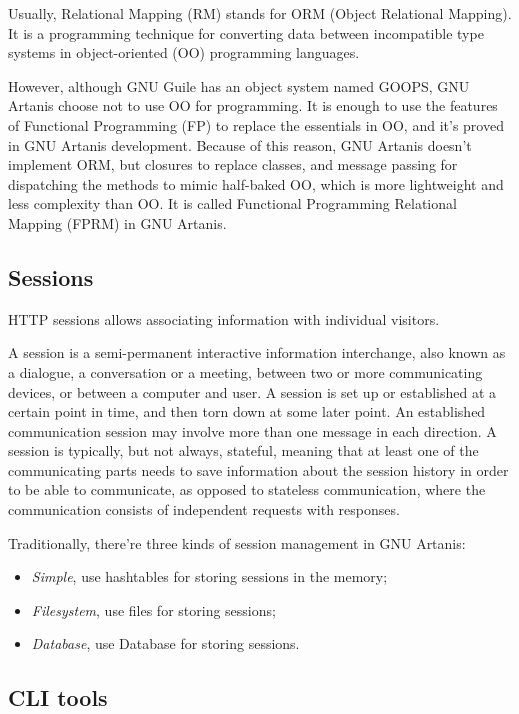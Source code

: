 \documentclass[numbers,numberedpars]{sigplanconf}
\begin{document}
Usually, Relational Mapping (RM) stands for ORM (Object Relational Mapping).
It is a programming technique for converting data between incompatible type systems in object-oriented (OO) programming languages.

However, although GNU Guile has an object system named GOOPS, GNU Artanis choose not to use OO for programming. It is enough
to use the features of Functional Programming (FP) to replace the essentials in OO, and it's proved in GNU Artanis development.
Because of this reason, GNU Artanis doesn't implement ORM, but closures to replace classes, and message passing for dispatching the methods
to mimic half-baked OO, which is more lightweight and less complexity than OO. It is called Functional Programming Relational Mapping (FPRM)
in GNU Artanis.

\subsection{Sessions}

HTTP sessions allows associating information with individual visitors.

A session is a semi-permanent interactive information interchange, also known as a dialogue, a conversation or a meeting, between two or more
communicating devices, or between a computer and user. A session is set up or established at a certain point in time, and then
torn down at some later point. An established communication session may involve more than one message in each direction. A session is typically,
but not always, stateful, meaning that at least one of the communicating parts needs to save information about the session history in order to be
able to communicate, as opposed to stateless communication, where the communication consists of independent requests with responses.

Traditionally, there're three kinds of session management in GNU Artanis:

\begin{itemize}
\item {\it Simple}, use hashtables for storing sessions in the memory;
\item {\it Filesystem}, use files for storing sessions;
\item {\it Database}, use Database for storing sessions.
\end{itemize}

\subsection{CLI tools} \label{CLI tools}
\end{document}
